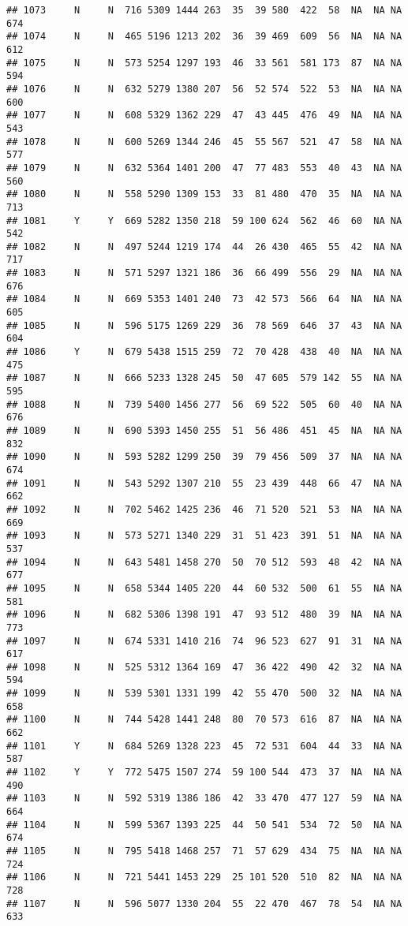 \documentclass[]{article}
\begin{document}
\begin{verbatim}
## 1073     N     N  716 5309 1444 263  35  39 580  422  58  NA  NA NA  674
## 1074     N     N  465 5196 1213 202  36  39 469  609  56  NA  NA NA  612
## 1075     N     N  573 5254 1297 193  46  33 561  581 173  87  NA NA  594
## 1076     N     N  632 5279 1380 207  56  52 574  522  53  NA  NA NA  600
## 1077     N     N  608 5329 1362 229  47  43 445  476  49  NA  NA NA  543
## 1078     N     N  600 5269 1344 246  45  55 567  521  47  58  NA NA  577
## 1079     N     N  632 5364 1401 200  47  77 483  553  40  43  NA NA  560
## 1080     N     N  558 5290 1309 153  33  81 480  470  35  NA  NA NA  713
## 1081     Y     Y  669 5282 1350 218  59 100 624  562  46  60  NA NA  542
## 1082     N     N  497 5244 1219 174  44  26 430  465  55  42  NA NA  717
## 1083     N     N  571 5297 1321 186  36  66 499  556  29  NA  NA NA  676
## 1084     N     N  669 5353 1401 240  73  42 573  566  64  NA  NA NA  605
## 1085     N     N  596 5175 1269 229  36  78 569  646  37  43  NA NA  604
## 1086     Y     N  679 5438 1515 259  72  70 428  438  40  NA  NA NA  475
## 1087     N     N  666 5233 1328 245  50  47 605  579 142  55  NA NA  595
## 1088     N     N  739 5400 1456 277  56  69 522  505  60  40  NA NA  676
## 1089     N     N  690 5393 1450 255  51  56 486  451  45  NA  NA NA  832
## 1090     N     N  593 5282 1299 250  39  79 456  509  37  NA  NA NA  674
## 1091     N     N  543 5292 1307 210  55  23 439  448  66  47  NA NA  662
## 1092     N     N  702 5462 1425 236  46  71 520  521  53  NA  NA NA  669
## 1093     N     N  573 5271 1340 229  31  51 423  391  51  NA  NA NA  537
## 1094     N     N  643 5481 1458 270  50  70 512  593  48  42  NA NA  677
## 1095     N     N  658 5344 1405 220  44  60 532  500  61  55  NA NA  581
## 1096     N     N  682 5306 1398 191  47  93 512  480  39  NA  NA NA  773
## 1097     N     N  674 5331 1410 216  74  96 523  627  91  31  NA NA  617
## 1098     N     N  525 5312 1364 169  47  36 422  490  42  32  NA NA  594
## 1099     N     N  539 5301 1331 199  42  55 470  500  32  NA  NA NA  658
## 1100     N     N  744 5428 1441 248  80  70 573  616  87  NA  NA NA  662
## 1101     Y     N  684 5269 1328 223  45  72 531  604  44  33  NA NA  587
## 1102     Y     Y  772 5475 1507 274  59 100 544  473  37  NA  NA NA  490
## 1103     N     N  592 5319 1386 186  42  33 470  477 127  59  NA NA  664
## 1104     N     N  599 5367 1393 225  44  50 541  534  72  50  NA NA  674
## 1105     N     N  795 5418 1468 257  71  57 629  434  75  NA  NA NA  724
## 1106     N     N  721 5441 1453 229  25 101 520  510  82  NA  NA NA  728
## 1107     N     N  596 5077 1330 204  55  22 470  467  78  54  NA NA  633

\end{verbatim}
\end{document}
